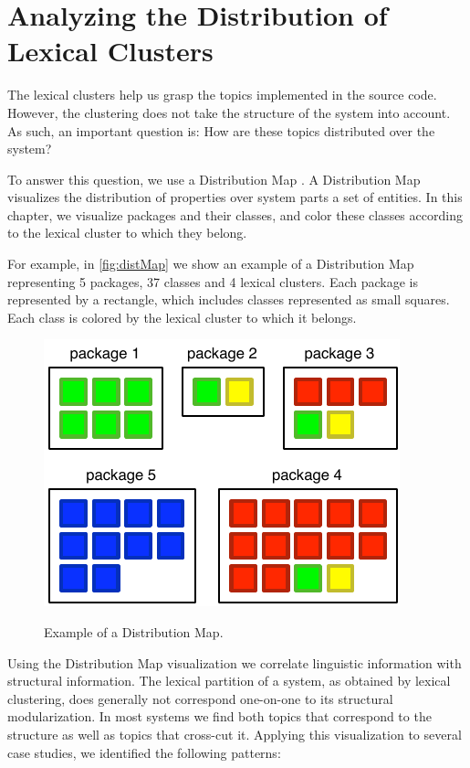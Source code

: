 \section{Analyzing the Distribution of Lexical Clusters}\label{sec:distribution}

The lexical clusters help us grasp the topics implemented in the source code. However, the clustering does not take the structure of the system into account. As such, an important question is: How are these topics distributed over the system?

To answer this question, we use a Distribution Map \cite{Tuft01a,Duca06c}. A Distribution Map visualizes the distribution of properties over system parts \ie a set of entities. In this chapter, we visualize packages and their classes, and color these classes according to the lexical cluster to which they belong.

For example, in \autoref{fig:distMap} we show an example of a Distribution Map representing 5 packages, 37 classes and 4 lexical clusters. Each package is represented by a rectangle, which includes classes represented as small squares. Each class is colored by the lexical cluster to which it belongs.

\begin{figure}[h]
    \centering
  \includegraphics[width=0.4\columnwidth]{fig/hapax-distributionmap-example}\\
  \caption{Example of a Distribution Map.}\label{fig:distMap}
\end{figure}

Using the Distribution Map visualization we correlate linguistic information with structural information. The lexical partition of a system, as obtained by lexical clustering, does generally not correspond one-on-one to its structural modularization. In most systems we find both topics that correspond to the structure as well as topics that cross-cut it. Applying this visualization to several case studies, we identified the following patterns:

